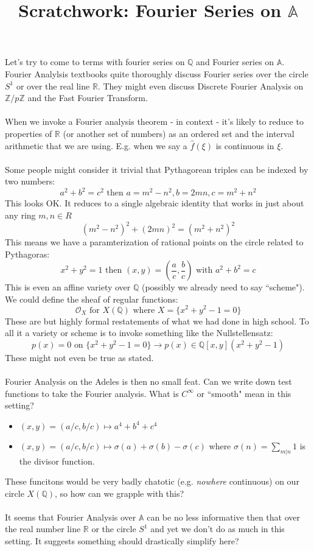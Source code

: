 \documentclass[12pt]{article}
\title{Scratchwork: Fourier Series on $\mathbb{A}$}
\date{}
\begin{document}

\sffamily

\maketitle

\noindent Let's try to come to terms with fourier series on $\mathbb{Q}$ and Fourier series on $\mathbb{A}$.  Fourier Analylsis textbooks quite thoroughly discuss Fourier series over the circle $S^1$ or over the real line $\mathbb{R}$.  They might even discuss Discrete Fourier Analysis on $\mathbb{Z}/p\mathbb{Z}$ and the Fast Fourier Transform.\\ \\
When we invoke a Fourier analysis theorem - in context - it's likely to reduce to properties of $\mathbb{R}$ (or another set of numbers) as an ordered set and the interval arithmetic that we are using.   E.g. when we say a $\widehat{f}(\xi)$ is continuous in $\xi$. \\ \\
Some people might consider it trivial that Pythagorean triples can be indexed by two numbers:
$$ a^2 + b^2 = c^2 \text{ then } a = m^2 - n^2, b = 2mn, c = m^2 + n^2 $$
This looks OK. It reduces to a single algebraic identity that works in just about any ring $m, n \in R$ 
$$ (m^2 - n^2)^2 + (2mn)^2 = (m^2 + n^2)^2 $$
This means we have a paramterization of rational points on the circle related to Pythagoras:
$$ x^2 + y^2 = 1 \text{ then } (x,y) = (\frac{a}{c}, \frac{b}{c}) \text{ with }a^2 +b^2 = c $$
This is even an affine variety over $\mathbb{Q}$ (possibly we already need to say ``scheme").  We could define the sheaf of regular functions:
$$ \mathcal{O}_X \text{ for } X(\mathbb{Q}) \text{ where } X = \{ x^2 + y^2 - 1 = 0 \}$$
These are but highly formal restatements of what we had done in high school.  To all it a variety or scheme is to invoke something like the Nullstellensatz:
$$ p(x) = 0 \text{ on }\{ x^2 + y^2 - 1 = 0 \} \to p(x) \in \mathbb{Q}[x,y](x^2 + y^2 - 1) $$
These might not even be true as stated.  \\ \\
Fourier Analysis on the Adeles is then no small feat.  Can we write down test functions to take the Fourier analysis.  What is $C^\infty$ or ``smooth" mean in this setting?
\begin{itemize}
\item $(x,y) = (a/c,b/c) \mapsto a^4 + b^4 + c^4$
\item $(x,y) = (a/c,b/c) \mapsto \sigma(a) + \sigma(b) - \sigma(c)$ where $\sigma(n) = \sum_{m|n} 1$ is the divisor function.
\end{itemize}
These funcitons would be very badly chatotic (e.g. \textit{nowhere} continuous) on our circle $X(\mathbb{Q})$, so how can we grapple with this? \\ \\
It seems that Fourier Analysis over $\mathbb{A}$ can be no less informative then that over the real number line $\mathbb{R}$ or the circle $S^1$ and yet we don't do as much in this setting.  It suggests something should drastically simplify here?
\end{document}
